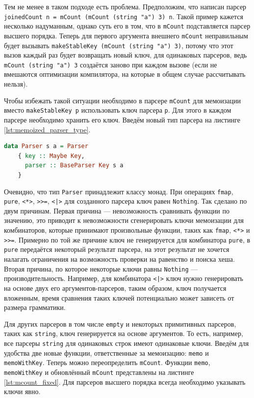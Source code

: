 \documentclass[times]{itmo-student-thesis}
\begin{document}
Тем не менее в таком подходе есть проблема. Предположим, что написан парсер \lstinline{joinedCount n = mCount (mCount (string "a") 3) n}.
Такой пример кажется несколько надуманным, однако суть его в том, что в \lstinline{mCount} подставляется парсер высшего порядка.
Теперь для первого аргумента внешнего \lstinline{mCount} неправильным будет вызывать \lstinline{makeStableKey (mCount (string "a") 3)}, потому что
этот вызов каждый раз будет возвращать новый ключ, для одинаковых парсеров, ведь \lstinline{mCount (string "a") 3} создаётся заново при каждом вызове
(если не вмешаются оптимизации компилятора, на которые в общем случае рассчитывать нельзя).

Чтобы избежать такой ситуации необходимо в парсере \lstinline{mCount} для мемоизации вместо \lstinline{makeStableKey p}
использовать ключ парсера \lstinline{p}. Для этого в каждом парсере необходимо хранить его ключ. Введём новый тип парсера на листинге \ref{lst:memoized_parser_type}. 

\begin{lstlisting}[language=Haskell,float=!h,caption={Тип парсера с ключом},label={lst:memoized_parser_type}]
  data Parser s a = Parser
    { key :: Maybe Key,
      parser :: BaseParser Key s a
    }
\end{lstlisting}

Очевидно, что тип \lstinline{Parser} принадлежит классу монад. При операциях \lstinline{fmap},
\lstinline{pure}, \lstinline{<*>}, \lstinline{>>=}, \lstinline{<|>} для созданного парсера
ключ равен \lstinline{Nothing}. Так сделано по двум причинам. Первая причина --- невозможность сравнивать функции по
значению, это приводит к невозможности сгенерировать ключи мемоизации для комбинаторов, которые принимают произвольные
функции, таких как \lstinline{fmap}, \lstinline{<*>} и \lstinline{>>=}. Примерно по той же причине ключ не
генерируется для  комбинатора \lstinline{pure}, в \lstinline{pure} передаётся некоторый результат парсера, на этот
результат не хочется налагать ограничения на возможность проверки на равенство и поиска хеша. Вторая причина, по
которое некоторые ключи равны \lstinline{Nothing} --- производительность. Например, для комбинатора \lstinline{<|>}
ключ нужно генерировать на основе двух его аргументов-парсеров, таким образом, ключ получается вложенным, время сравнения таких ключей потенциально 
может зависеть от размера грамматики. 

Для других парсеров в том числе \lstinline{empty} и некоторых примитивных парсеров, таких как
\lstinline{string}, ключ генерируется на основе аргументов. То есть, например, все парсеры \lstinline{string} для
одинаковых строк имеют одинаковые ключи. Введём для удобства две новые функции, ответственные за мемоизацию:
\lstinline{memo} и \lstinline{memoWithKey}. Теперь можно переопределить
\lstinline{mCount}. Функции \lstinline{memo}, \lstinline{memoWithKey} и обновлённый \lstinline{mCount} представлены на
листинге \ref{lst:mcount_fixed}. Для парсеров высшего порядка всегда необходимо указывать ключи явно.
\end{document}
